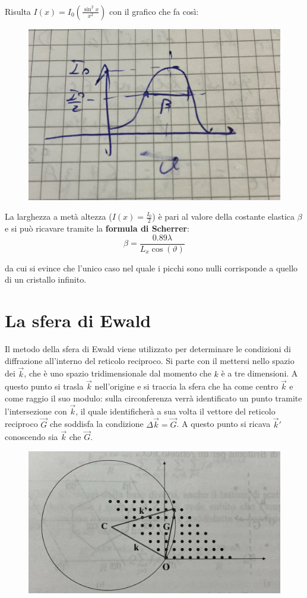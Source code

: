 \documentclass{book}
\begin{document}
            \paragraph{}
                Risulta $I(x) = I_{0}(\frac{\sin ^{2} x}{x^{2}})$ con il grafico che fa così:
                \begin{figure}[h!]
                    \centering
                    \includegraphics[width=0.5\linewidth]{img/scherrerFormulaLez9.png}
                \end{figure}
            La larghezza a metà altezza ($I(x) = \frac{I_{0}}{2}$) è pari al valore della costante elastica $\beta$ e si può ricavare tramite la \textbf{formula di Scherrer}:
            $$\beta = \frac{0.89 \lambda}{L_{x} \cos{(\vartheta)}}$$

            da cui si evince che l'unico caso nel quale i picchi sono nulli corrisponde a quello di un cristallo infinito. 
    \section{La sfera di Ewald}
            Il metodo della sfera di Ewald viene utilizzato per determinare le condizioni di 
            diffrazione all'interno del reticolo reciproco. Si parte con il mettersi nello spazio dei $\vec{k}$, che è 
            uno spazio tridimensionale dal momento che $k$ è a tre dimensioni. A questo punto si trasla $\vec{k}$ nell'origine 
            e si traccia la sfera che ha come centro $\vec{k}$ e come raggio il suo modulo: sulla circonferenza verrà identificato 
            un punto tramite l'intersezione con $\vec{k}$, il quale identificherà a sua volta il vettore del reticolo 
            reciproco $\vec{G}$ che soddisfa la condizione $\Delta \vec{k}=\vec{G}$. A questo punto si ricava $\vec{k}'$ conoscendo
            sia $\vec{k}$ che $\vec{G}$.
            \begin{figure}[h!]
                \center  
                \includegraphics[width=0.6\linewidth]{img/SferaEwald.jpg}
            \end{figure}
\end{document}
